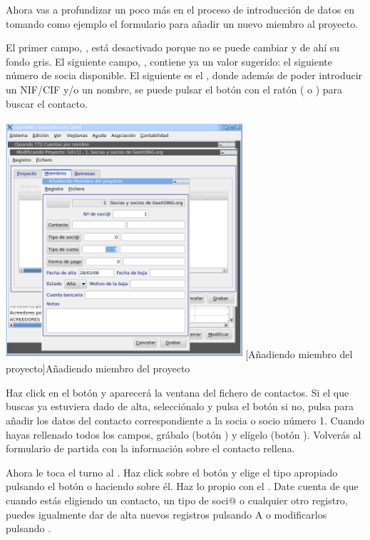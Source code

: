 Ahora vas a profundizar un poco más en el proceso de introducción de
datos en \appname tomando como ejemplo el formulario para añadir un
nuevo miembro al proyecto.

El primer campo, , está desactivado
porque no se puede cambiar y de ahí su fondo gris. El siguiente
campo, , contiene ya
un valor sugerido: el siguiente número de socia disponible. El
siguiente es el , donde además de poder
introducir un NIF/CIF y/o un nombre, se puede pulsar el botón
 con el ratón ( o
 ) para buscar el contacto.

\begin{center}
\includegraphics[width=8.772cm,height=8.823cm]{manual-img14.png}
[Añadiendo miembro del proyecto]{Añadiendo miembro
del proyecto}

\end{center}
Haz click en el botón  y aparecerá la
ventana del fichero de contactos. Si el que buscas ya estuviera dado de
alta, selecciónalo y pulsa el botón 
si no, pulsa  para añadir los datos del
contacto correspondiente a la socia o socio número 1. Cuando hayas
rellenado todos los campos, grábalo (botón
) y elígelo (botón
). Volverás al formulario de partida con
la información sobre el contacto rellena.

Ahora le toca el turno al . Haz click
sobre el botón  y elige el tipo
apropiado pulsando el botón o haciendo
 sobre él. Haz lo propio con el
. Date cuenta de que cuando estás
eligiendo un contacto, un tipo de soci@ o cualquier otro registro,
puedes igualmente dar de alta nuevos registros pulsando
A o modificarlos pulsando
.

